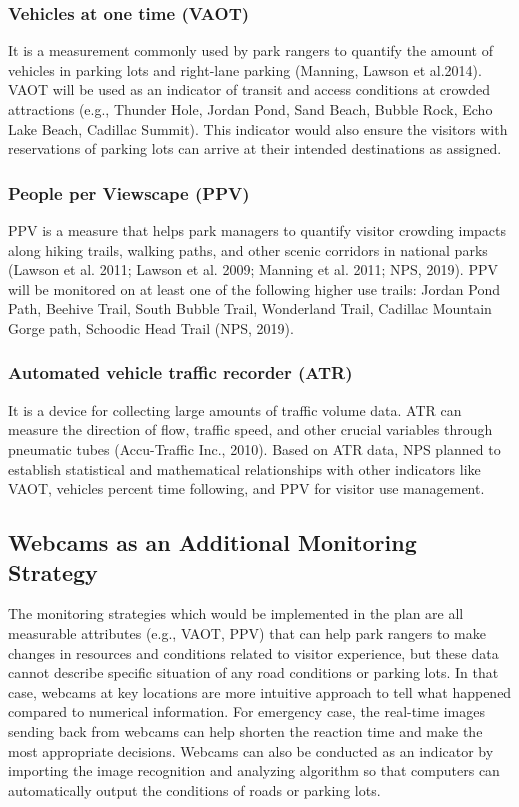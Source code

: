 \subsubsection*{Vehicles at one time (VAOT)}
\par It is a measurement commonly used by park rangers to quantify the amount of vehicles in parking lots and right-lane parking (Manning, Lawson et al.2014). VAOT will be used as an indicator of transit and access conditions at crowded attractions (e.g., Thunder Hole, Jordan Pond, Sand Beach, Bubble Rock, Echo Lake Beach, Cadillac Summit). This indicator would also ensure the visitors with reservations of parking lots can arrive at their intended destinations as assigned.

\subsubsection*{People per Viewscape (PPV)}
\par PPV is a measure that helps park managers to quantify visitor crowding impacts along hiking trails, walking paths, and other scenic corridors in national parks (Lawson et al. 2011; Lawson et al. 2009; Manning et al. 2011; NPS, 2019). PPV will be monitored on at least one of the following higher use trails: Jordan Pond Path, Beehive Trail, South Bubble Trail, Wonderland Trail, Cadillac Mountain Gorge path, Schoodic Head Trail (NPS, 2019).

\subsubsection*{Automated vehicle traffic recorder (ATR)}
\par It is a device for collecting large amounts of traffic volume data. ATR can measure the direction of flow, traffic speed, and other crucial variables through pneumatic tubes (Accu-Traffic Inc., 2010). Based on ATR data, NPS planned to establish statistical and mathematical relationships with other indicators like VAOT, vehicles percent time following, and PPV for visitor use management.

\subsection{Webcams as an Additional Monitoring Strategy}
\par The monitoring strategies which would be implemented in the plan are all measurable attributes (e.g., VAOT, PPV) that can help park rangers to make changes in resources and conditions related to visitor experience, but these data cannot describe specific situation of any road conditions or parking lots. In that case, webcams at key locations are more intuitive approach to tell what happened compared to numerical information. For emergency case, the real-time images sending back from webcams can help shorten the reaction time and make the most appropriate decisions. Webcams can also be conducted as an indicator by importing the image recognition and analyzing algorithm so that computers can automatically output the conditions of roads or parking lots.

